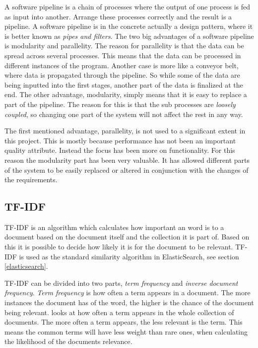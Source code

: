 A software pipeline is a chain of processes where the output of one process is fed as input into another. Arrange these processes correctly and the result is a pipeline. A software pipeline is in the concrete actually a design pattern, where it is better known as \textit{pipes and filters}\cite{pipes-and-filters}. The two big advantages of a software pipeline is modularity and parallelity\cite{dart}. The reason for parallelity is that the data can be spread across several processes. This means that the data can be processed in different instances of the program. Another case is more like a conveyor belt, where data is propagated through the pipeline. So while some of the data are being inputted into the first stages, another part of the data is finalized at the end. The other advantage, modularity, simply means that it is easy to replace a part of the pipeline. The reason for this is that the sub processes are \textit{loosely coupled}, so changing one part of the system will not affect the rest in any way.

The first mentioned advantage, parallelity, is not used to a significant extent in this project. This is mostly because performance has not been an important quality attribute. Instead the focus has been more on functionality. For this reason the modularity part has been very valuable. It has allowed different parts of the system to be easily replaced or altered in conjunction with the changes of the requirements.


\subsection{TF-IDF} \label{tf/idf}
TF-IDF is an algorithm which calculates how important an word is to a document based on the document itself and the collection it is part of. Based on this it is possible to decide how likely it is for the document to be relevant. TF-IDF is used as the standard similarity algorithm in ElasticSearch, see section \ref{elasticsearch}.

TF-IDF can be divided into two parts, \textit{term frequency} and \textit{inverse document frequency}. \textit{Term frequency} is how often a term appears in a document. The more instances the document has of the word, the higher is the chance of the document being relevant.  looks at how often a term appears in the whole collection of documents. The more often a term appears, the less relevant is the term. This means the common terms will have less weight than rare ones, when calculating the likelihood of the documents relevance. 

\cleardoublepage